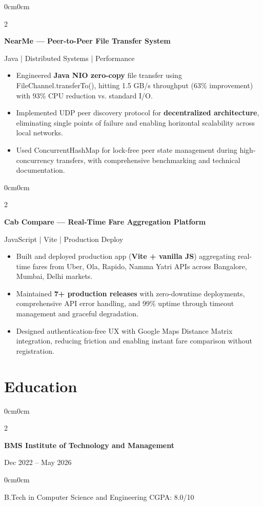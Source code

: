 \documentclass[10pt, letterpaper]{article}
\newenvironment{highlights}{
    \begin{itemize}[topsep=0pt, parsep=0pt, partopsep=0pt, itemsep=1.2pt, leftmargin=10pt]
}{
    \end{itemize}
}
\newenvironment{onecolentry}{
    \begin{adjustwidth}{0cm}{0cm}
}{
    \end{adjustwidth}
}
\newenvironment{twocolentry}[2][]{
    \onecolentry
    \def\secondColumn{#2}
    \setcolumnwidth{\fill, 4.5cm}
    \begin{paracol}{2}
}{
    \switchcolumn \raggedleft \secondColumn
    \end{paracol}
    \endonecolentry
}
\begin{document}
\vspace{0.12cm}

\begin{twocolentry}{Java | Distributed Systems | Performance}
    \textbf{NearMe — Peer-to-Peer File Transfer System} \href{https://github.com/Prakharm927/NearMe}{\faGithub}
\end{twocolentry}
\begin{highlights}
    \item Engineered \textbf{Java NIO zero-copy} file transfer using FileChannel.transferTo(), hitting 1.5 GB/s throughput (63\% improvement) with 93\% CPU reduction vs. standard I/O.
    \item Implemented UDP peer discovery protocol for \textbf{decentralized architecture}, eliminating single points of failure and enabling horizontal scalability across local networks.
    \item Used ConcurrentHashMap for lock-free peer state management during high-concurrency transfers, with comprehensive benchmarking and technical documentation.
\end{highlights}

\vspace{0.12cm}

\begin{twocolentry}{JavaScript | Vite | Production Deploy}
    \textbf{Cab Compare — Real-Time Fare Aggregation Platform} \href{https://github.com/Prakharm927/cab-compare-for-all-cabs}{\faGithub}
\end{twocolentry}
\begin{highlights}
    \item Built and deployed production app (\textbf{Vite + vanilla JS}) aggregating real-time fares from Uber, Ola, Rapido, Namma Yatri APIs across Bangalore, Mumbai, Delhi markets.
    \item Maintained \textbf{7+ production releases} with zero-downtime deployments, comprehensive API error handling, and 99\% uptime through timeout management and graceful degradation.
    \item Designed authentication-free UX with Google Maps Distance Matrix integration, reducing friction and enabling instant fare comparison without registration.
\end{highlights}

\section{Education}
\begin{twocolentry}{Dec 2022 – May 2026}
    \textbf{BMS Institute of Technology and Management}
\end{twocolentry}
\begin{onecolentry}
    B.Tech in Computer Science and Engineering \textbar{} CGPA: 8.0/10
\end{onecolentry}
\end{document}
